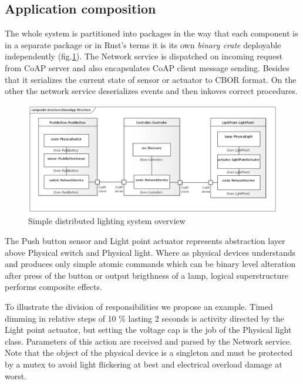 \documentclass[11pt, english, a4paper, twoside]{article}
\begin{document}
\subsection{Application composition}
The whole system is partitioned into packages in the way that each component is in a separate package or in Rust's terms it is its own \emph{binary crate} deployable independently (fig.\ref{fig:demoapp-structure}). The Network service is dispatched on incoming request from CoAP server and also encapsulates CoAP client message sending. Besides that it serializes the current state of sensor or actuator to CBOR format. On the other the network service deserializes events and then inkoves correct procedures. 

\begin{figure}
	\centering
	\includegraphics[width=\textwidth]{DemoApp-Structure.png}
	\caption{Simple distributed lighting system overview}
	\label{fig:demoapp-structure}
\end{figure}

The Push button sensor and Light point actuator represents abstraction layer above Physical switch and Physical light. Where as physical devices understands and produces only simple atomic commands which can be binary level alteration after press of the button or output brigthness of a lamp, logical superstructure performs composite effects. 

To illustrate the division of responsibilities we propose an example. Timed dimming in relative steps of 10 \% lasting 2 seconds is activity directed by the Light point actuator, but setting the voltage cap is the job of the Physical light class. Parameters of this action are received and parsed by the Network service. Note that the object of the physical device is a singleton and must be protected by a mutex to avoid light flickering at best and electrical overload damage at worst.
\end{document}
